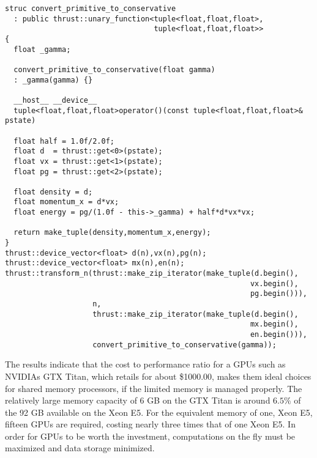 \begin{lstlisting} 
struc convert_primitive_to_conservative
  : public thrust::unary_function<tuple<float,float,float>,
                                  tuple<float,float,float>>
{
  float _gamma;
  
  convert_primitive_to_conservative(float gamma)
  : _gamma(gamma) {}

  __host__ __device__
  tuple<float,float,float>operator()(const tuple<float,float,float>& pstate)

  float half = 1.0f/2.0f;
  float d  = thrust::get<0>(pstate);
  float vx = thrust::get<1>(pstate);
  float pg = thrust::get<2>(pstate);

  float density = d;
  float momentum_x = d*vx;
  float energy = pg/(1.0f - this->_gamma) + half*d*vx*vx;
  
  return make_tuple(density,momentum_x,energy);
}
thrust::device_vector<float> d(n),vx(n),pg(n); 
thrust::device_vector<float> mx(n),en(n); 
thrust::transform_n(thrust::make_zip_iterator(make_tuple(d.begin(),
                                                        vx.begin(),
                                                        pg.begin())),
                    n,
                    thrust::make_zip_iterator(make_tuple(d.begin(),
                                                        mx.begin(),
                                                        en.begin())),
                    convert_primitive_to_conservative(gamma));
\end{lstlisting} 

 The results indicate that the cost to performance ratio for a  GPUs such as NVIDIAs GTX Titan, which retails for about \$1000.00, makes them ideal choices for shared memory processors, if the limited memory is managed properly.  The relatively large memory capacity of 6 GB on the GTX Titan is around $6.5\%$ of the 92 GB available on the Xeon E5.  For the equivalent memory of one, Xeon E5, fifteen GPUs are required, costing nearly three times that of one Xeon E5.  In order for GPUs to be worth the investment, computations on the fly must be maximized and data storage minimized.
